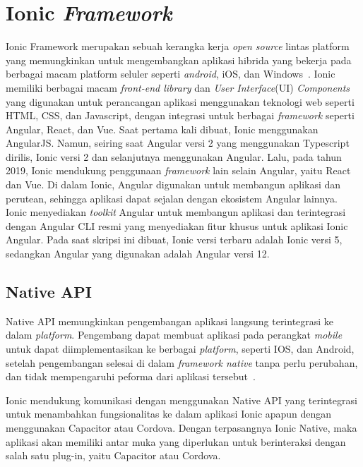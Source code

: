 \section{Ionic {\it Framework}}
\label{sec:ionicframework} 
 
Ionic Framework merupakan sebuah kerangka kerja {\it open source} lintas platform yang memungkinkan untuk mengembangkan aplikasi hibrida yang bekerja pada berbagai macam platform seluler seperti {\it android}, iOS, dan Windows~\cite{waranashiwar:18:ionic}. Ionic memiliki berbagai macam \textit{front-end library} dan \textit{User Interface}(UI) {\it Components} yang digunakan untuk  perancangan aplikasi menggunakan teknologi web seperti HTML, CSS, dan Javascript, dengan integrasi untuk berbagai \textit{framework} seperti Angular, React, dan Vue. Saat pertama kali dibuat, Ionic menggunakan AngularJS. Namun, seiring saat Angular versi 2 yang menggunakan Typescript dirilis, Ionic versi 2 dan selanjutnya menggunakan Angular. Lalu, pada tahun 2019, Ionic mendukung penggunaan \textit{framework} lain selain Angular, yaitu React dan Vue. Di dalam Ionic, Angular digunakan untuk membangun aplikasi dan perutean, sehingga aplikasi dapat sejalan dengan ekosistem Angular lainnya. Ionic menyediakan {\it toolkit} Angular untuk membangun aplikasi dan terintegrasi dengan Angular CLI resmi yang menyediakan fitur khusus untuk aplikasi Ionic Angular. Pada saat skripsi ini dibuat, Ionic versi terbaru adalah Ionic versi 5, sedangkan Angular yang digunakan adalah Angular versi 12. 

\subsection{Native API}
\label{subsec:nativeApi}
Native API memungkinkan pengembangan aplikasi langsung terintegrasi ke dalam {\it platform}. Pengembang dapat membuat aplikasi pada perangkat {\it mobile} untuk dapat diimplementasikan ke berbagai {\it platform}, seperti IOS, dan Android, setelah pengembangan selesai di dalam {\it framework native} tanpa perlu perubahan, dan tidak mempengaruhi peforma dari aplikasi tersebut~\cite{griffith:17:mobile}. 

Ionic mendukung komunikasi dengan menggunakan Native API yang terintegrasi untuk menambahkan fungsionalitas ke dalam aplikasi Ionic apapun dengan menggunakan Capacitor atau Cordova. Dengan terpasangnya Ionic Native, maka aplikasi akan memiliki antar muka yang diperlukan untuk berinteraksi dengan salah satu plug-in, yaitu Capacitor atau Cordova.

